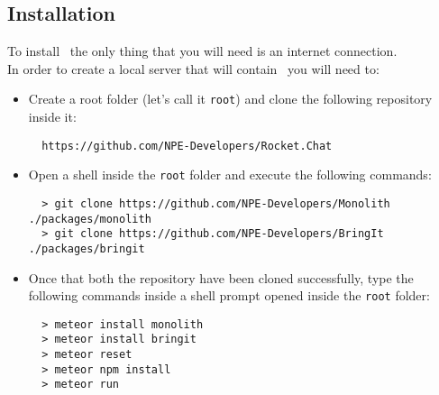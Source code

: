 \subsection{Installation}
To install \app\ the only thing that you will need is an internet connection. \\
In order to create a local server that will contain \app\ you will need to:
\begin{itemize}
	\item Create a root folder (let's call it \texttt{root}) and clone the following  repository inside it:
	\begin{lstlisting}
  https://github.com/NPE-Developers/Rocket.Chat
	\end{lstlisting}
	
	\item Open a shell inside the \texttt{root} folder and execute the following commands:
	\begin{lstlisting}
  > git clone https://github.com/NPE-Developers/Monolith ./packages/monolith
  > git clone https://github.com/NPE-Developers/BringIt ./packages/bringit
	\end{lstlisting}
	
	\item Once that both the repository have been cloned successfully, type the following commands inside a shell prompt opened inside the \texttt{root} folder:
	\begin{lstlisting}
  > meteor install monolith
  > meteor install bringit
  > meteor reset
  > meteor npm install
  > meteor run
	\end{lstlisting}

\end{itemize}


